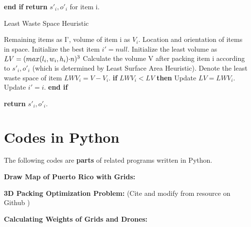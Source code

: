 \documentclass{mcmthesis}
\begin{document}
\begin{appendices}
\begin{algorithm}
\begin{algorithmic}[2]
    			\STATE \textbf{end if}
    			\ENDFOR
    			\ENDFOR
    			\STATE \textbf{return} $s'_i, o'_i$ for item i.
    		\end{algorithmic}  
    	\end{algorithm}
    	
    	\begin{algorithm}
    		\label{al3}
    		\renewcommand{\algorithmicrequire}{\textbf{Input:}}
    		\renewcommand{\algorithmicensure}{\textbf{Output: }}
    		\caption{Least Waste Space Heuristic}
    		\begin{algorithmic}[1]
    			\REQUIRE Remaining items as I', volume of item i as $V_i$.
    			\ENSURE Location and orientation of items in space.
    			\STATE  Initialize the best item $i' =null$.
    			\STATE  Initialize the least volume as $LV = {(max({l_i},{w_i},{h_i}){\rm{\cdot}}n)^3}$
    			\STATE   Calculate the volume V after packing item i according to $s'_i, o'_i$ (which is determined by Least Surface Area Heuristic). Denote the least waste space of item $LWV_i = V-V_i$. 
    			\STATE   \textbf{if} $LWV_i<LV$ \textbf{then}
    			\STATE Update $LV=LWV_i$.
    			\STATE Update $i'=i$.
    			\STATE \textbf{end if}
    			
    			\ENDFOR
    			
    			\STATE \textbf{return} $s'_i, o'_i$.
    		\end{algorithmic}  
    	\end{algorithm}
    
    	\section{Codes in Python}
    	
    	The following codes are \textbf{parts} of related programs written in Python.  \par
    \textbf{Draw Map of Puerto Rico with Grids: }
     \par
      \textbf{3D Packing Optimization Problem:} (Cite and modify from resource on Github ) 
    
     \textbf{Calculating Weights of Grids and Drones:} 
    
    

\end{appendices}
\end{document}
